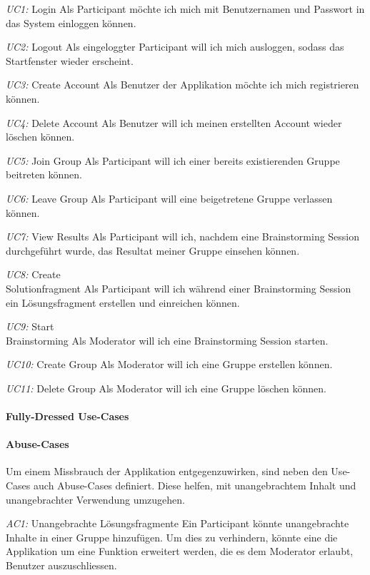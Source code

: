 \begin{basedescript}{
		\desclabelstyle{\multilinelabel}
		\desclabelwidth{4.5cm}}
	\item[\textit{UC1: }Login] Als Participant möchte ich mich mit Benutzernamen und Passwort in das System einloggen können.
	\item[\textit{UC2: }Logout] Als eingeloggter Participant will ich mich ausloggen, sodass das Startfenster wieder erscheint.
	\item[\textit{UC3: }Create Account] Als Benutzer der Applikation möchte ich mich registrieren können.
	\item[\textit{UC4: }Delete Account] Als Benutzer will ich meinen erstellten Account wieder löschen können.
	\item[\textit{UC5: }Join Group] Als Participant will ich einer bereits existierenden Gruppe beitreten können.
	\item[\textit{UC6: }Leave Group] Als Participant will eine beigetretene Gruppe verlassen können.
	\item[\textit{UC7: }View Results] Als Participant will ich, nachdem eine Brainstorming Session durchgeführt wurde, das Resultat meiner Gruppe einsehen können.
	\item[\textit{UC8: }Create\\Solutionfragment] Als Participant will ich während einer Brainstorming Session ein Lösungsfragment erstellen und einreichen können. 
	\item[\textit{UC9: }Start \\Brainstorming] Als Moderator will ich eine Brainstorming Session starten.
	\item[\textit{UC10: }Create Group] Als Moderator will ich eine Gruppe erstellen können. 
	\item[\textit{UC11: }Delete Group] Als Moderator will ich eine Gruppe löschen können.
\end{basedescript}

\paragraph{Fully-Dressed Use-Cases}


\paragraph{Abuse-Cases}
Um einem Missbrauch der Applikation entgegenzuwirken, sind neben den Use-Cases auch Abuse-Cases definiert. Diese helfen, mit unangebrachtem Inhalt und unangebrachter Verwendung umzugehen.
\begin{basedescript}{%
		\desclabelstyle{\multilinelabel}
		\desclabelwidth{4.5cm}}
	\item[\textit{AC1: }Unangebrachte Lösungsfragmente] Ein Participant könnte unangebrachte Inhalte in einer Gruppe hinzufügen. Um dies zu verhindern, könnte eine die Applikation um eine Funktion erweitert werden, die es dem Moderator erlaubt, Benutzer auszuschliessen.
\end{basedescript}

